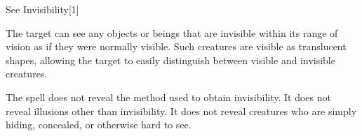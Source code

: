 \begin{spellsection}{See Invisibility}[1]
    \begin{spellheader}
    \end{spellheader}
    \begin{spellcontent}
        \begin{spelltargetinginfo}
        \end{spelltargetinginfo}
        \begin{spelleffects}
            \spelleffect The target can see any objects or beings that are invisible within its range of vision as if they were normally visible. Such creatures are visible as translucent shapes, allowing the target to easily distinguish between visible and invisible creatures.
            \spelldur \durpersonallong
        \end{spelleffects}
    \end{spellcontent}
    \begin{spellfooter}
        \spellnotes The spell does not reveal the method used to obtain invisibility. It does not reveal illusions other than invisibility. It does not reveal creatures who are simply hiding, concealed, or otherwise hard to see.
        \miscastexplode
    \end{spellfooter}
    \begin{spellaugments}
    \end{spellaugments}
\end{spellsection}

